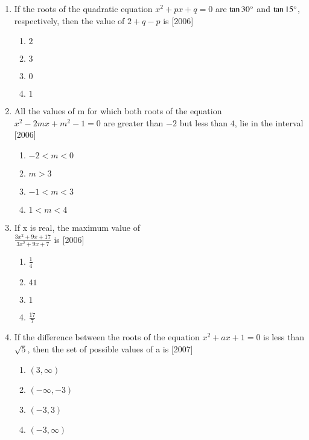 \documentclass[journal,12pt,twocolumn]{IEEEtran}
\theoremstyle{remark}
\begin{document}
\begin{enumerate}
\item If the roots of the quadratic equation $x^2 + px + q = 0$ are $\tan30\degree$ and $\tan15\degree$, respectively, then the value of $2 + q - p$ is
\hfill[2006]

\begin{enumerate}


	\item  $2$
	\item  $3$
	\item  $0$
	\item  $1$
		
\end{enumerate}

\item All the values of m for which both roots of the equation $x^2 - 2mx + m^2 - 1 = 0$ are greater than $-2$ but less than $4$, lie in the interval
\hfill[2006]

\begin{enumerate}

	\item  $-2 < m < 0$
	\item  $m > 3$
	\item  $-1 < m < 3$
	\item  $1 < m < 4$

\end{enumerate}

\item If x is real, the maximum value of\\
$\frac{3x^2 + 9x + 17}{3x^2 + 9x + 7}$ is
\hfill[2006]

\begin{enumerate}

	\item  $\frac{1}{4}$
	\item  $41$
	\item  $1$
	\item  $\frac{17}{7}$

\end{enumerate}

\item If the difference between the roots of the equation $x^2 + ax + 1 = 0$ is less than $\sqrt{5}$, then the set of possible values of a is
\hfill[2007]

\begin{enumerate}

	\item  $(3,\infty)$
	\item  $(-\infty, -3)$
	\item  $(-3, 3)$
	\item  $(-3, \infty)$


\end{enumerate}
\end{enumerate}
\end{document}
